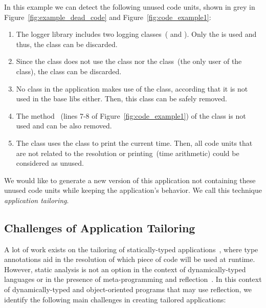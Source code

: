In this example we can detect the following unused code units, shown in grey in Figure~\ref{fig:example_dead_code} and Figure~\ref{fig:code_example1}:
\begin{enumerate}
\item The logger library includes two logging classes~( and ). Only the  is used and thus, the  class can be discarded.
\item Since the  class does not use the  class nor the  class~(the only user of the  class), the  class can be discarded.
\item No class in the application makes use of the  class, according that it is not used in the base libs either. Then, this class can be safely removed.
\item The method ~(lines 7-8 of Figure~\ref{fig:code_example1}) of the  class is not used and can be also removed.
\item The  class uses the  class to print the current time. Then, all code units that are not related to the  resolution or printing~(\ie time arithmetic) could be considered as unused.
\end{enumerate}

We would like to generate a new version of this application not containing these unused code units while keeping the application's behavior. We call this technique \emph{application tailoring}.

\subsection{Challenges of Application Tailoring} \label{sec:challenges}

A lot of work exists on the tailoring of statically-typed applications~\cite{Cour10a,Rays02a,Tip03a,Popa04a,Teod01a}, where type annotations aid in the resolution of which piece of code will be used at runtime. 
However, static analysis is not an option in the context of dynamically-typed languages or in the presence of meta-programming and reflection~\cite{Livs05a}.
In this context of dynamically-typed and object-oriented programs that may use reflection, we identify the following main challenges in creating tailored applications:

